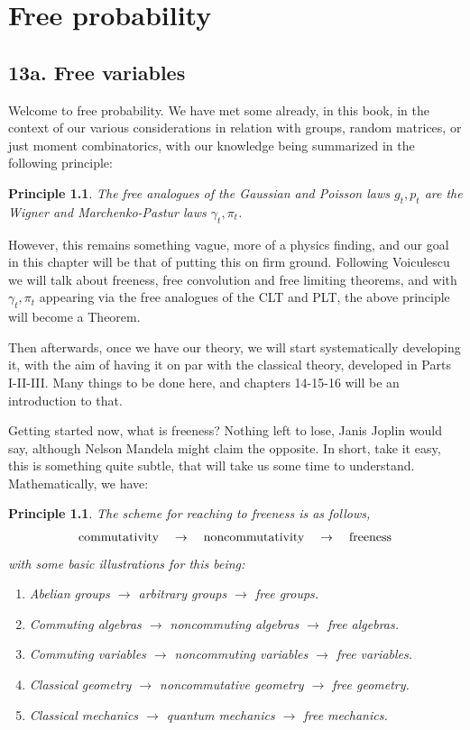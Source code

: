 \documentclass[12pt]{amsbook}
\newtheorem{principle}[theorem]{Principle}
\begin{document}
\chapter{Free probability}

\section*{13a. Free variables}

Welcome to free probability. We have met some already, in this book, in the context of our various considerations in relation with groups, random matrices, or just moment combinatorics, with our knowledge being summarized in the following principle:

\begin{principle}
The free analogues of the Gaussian and Poisson laws $g_t,p_t$ are the Wigner and Marchenko-Pastur laws $\gamma_t,\pi_t$.
\end{principle}

However, this remains something vague, more of a physics finding, and our goal in this chapter will be that of putting this on firm ground. Following Voiculescu \cite{vo1} we will talk about freeness, free convolution and free limiting theorems, and with $\gamma_t,\pi_t$ appearing via the free analogues of the CLT and PLT, the above principle will become a Theorem.

\bigskip

Then afterwards, once we have our theory, we will start systematically developing it, with the aim of having it on par with the classical theory, developed in Parts I-II-III. Many things to be done here, and chapters 14-15-16 will be an introduction to that.

\bigskip

Getting started now, what is freeness? Nothing left to lose, Janis Joplin would say, although Nelson Mandela might claim the opposite. In short, take it easy, this is something quite subtle, that will take us some time to understand. Mathematically, we have:

\begin{principle}
The scheme for reaching to freeness is as follows,
$${\rm commutativity}\quad\to\quad{\rm noncommutativity}\quad\to\quad {\rm freeness}$$
with some basic illustrations for this being:
\begin{enumerate}
\item Abelian groups $\to$ arbitrary groups $\to$ free groups.

\item Commuting algebras $\to$ noncommuting algebras $\to$ free algebras.

\item Commuting variables $\to$ noncommuting variables $\to$ free variables.

\item Classical geometry $\to$ noncommutative geometry $\to$ free geometry.

\item Classical mechanics $\to$ quantum mechanics $\to$ free mechanics.
\end{enumerate}
\end{principle}
\end{document}
